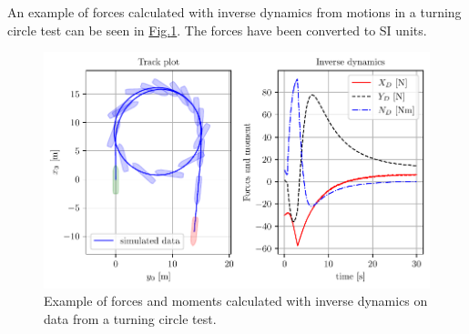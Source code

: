 \noindent An example of forces calculated with inverse dynamics from motions in a turning circle test can be seen in \hyperref[\detokenize{03.01_inverse_dynamics:fig-inverse}]{Fig.\@ \ref{\detokenize{03.01_inverse_dynamics:fig-inverse}}}. The forces have been converted to SI units.

\begin{figure}[H]
    \centering
    \includegraphics[width=\textwidth]{kappa/images/1.pdf}
    \caption{Example of forces and moments calculated with inverse dynamics on data from a turning circle test.}
    \label{\detokenize{03.01_inverse_dynamics:fig-inverse}}
\end{figure}

